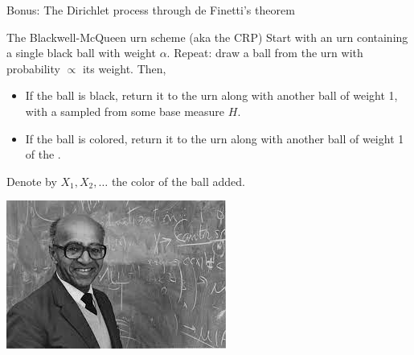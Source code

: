 \documentclass[10pt]{beamer}
\begin{document}


\begin{frame}{Bonus: The Dirichlet process through de Finetti's theorem}

\begin{block}{The Blackwell-McQueen urn scheme (aka the CRP)}
  Start with an urn containing a single black ball with weight $\alpha$. Repeat: draw a ball from the urn with probability $\propto$ its weight. Then,
  \begin{itemize}
    \item If the ball is black, return it to the urn along with another ball of weight 1, with a  sampled from some base measure $H$.
    \item If the ball is colored, return it to the urn along with another ball of weight 1 of the .
  \end{itemize}
  Denote by $X_1, X_2, \dots$ the color of the ball added.
\end{block}
\begin{flushright}
  \includegraphics[width=\twofigminus]{Figures/blackwell.jpg}
\end{flushright}
\vfill
\end{frame}
\end{document}
